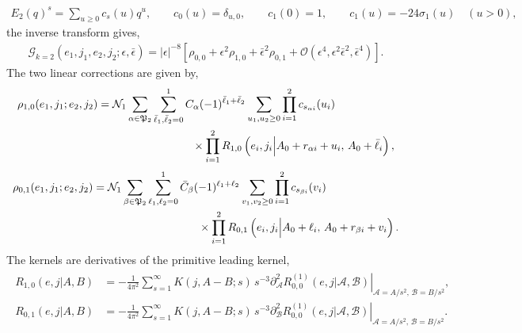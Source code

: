 \documentclass[12 pt]{article}
\begin{document}
\begin{align}
	    E_2(q)^s=\sum_{u\ge 0} c_s(u)q^u,
	    \qquad
    c_0(u)=\delta_{u,0},
    \qquad
    c_1(0)=1,\qquad
    c_1(u)=-24\sigma_1(u)\quad(u>0),
	\end{align}
	the inverse transform gives,
\begin{align}
    \mathcal{G}_{k=2}(e_1,j_1,e_2,j_2;\epsilon,\bar\epsilon)
    =|\epsilon|^{-8}\left[
    \rho_{0,0}
    +\epsilon^2\rho_{1,0}
    +\bar\epsilon^2\rho_{0,1}
    +\mathcal{O}(\epsilon^4,\epsilon^2\bar\epsilon^2,\bar\epsilon^4)
    \right].
\end{align}
\noindent
The two linear corrections are given by,
\begin{align}
\begin{split}
    \rho_{1,0}(e_1,j_1;e_2,j_2)
    &=
    \mathcal N_1
    \sum_{\alpha\in\mathfrak P_2}
    \sum_{\bar\ell_1,\bar\ell_2=0}^{1}
    C_\alpha(-1)^{\bar\ell_1+\bar\ell_2}
    \sum_{u_1,u_2\ge0}
    \prod_{i=1}^2 c_{s_{\alpha i}}(u_i)\\&\hspace{3 cm}\times
    \prod_{i=1}^2
    R_{1,0}
    \left(
    e_i,j_i\Big|
    A_0+r_{\alpha i}+u_i,\,
    A_0+\bar\ell_i
    \right),
\end{split}
\end{align}
\begin{align}
\begin{split}
    \rho_{0,1}(e_1,j_1;e_2,j_2)
    &=
    \mathcal N_1
    \sum_{\beta\in\mathfrak P_2}
    \sum_{\ell_1,\ell_2=0}^{1}
    \bar C_\beta(-1)^{\ell_1+\ell_2}
    \sum_{v_1,v_2\ge0}
    \prod_{i=1}^2 c_{s_{\beta i}}(v_i)\\
    &\quad\hspace{3 cm}\times
    \prod_{i=1}^2
    R_{0,1}
    \left(
    e_i,j_i\Big|
    A_0+\ell_i,\,
    A_0+r_{\beta i}+v_i
    \right).
\end{split}
\label{5.30jj}
\end{align}
The kernels are derivatives of the primitive leading kernel,
\begin{align}
\begin{split}
    R_{1,0}(e,j|A,B)
    &=
    -\frac{1}{4\pi^2}
    \sum_{s=1}^{\infty}
    K(j,A-B;s)\,s^{-3}
    \left.
    \partial_{\mathcal A}^2
    R_{0,0}^{(1)}(e,j|\mathcal A,\mathcal B)
    \right|_{\mathcal A=A/s^2,\,\mathcal B=B/s^2},
\\
    R_{0,1}(e,j|A,B)
    &=
    -\frac{1}{4\pi^2}
    \sum_{s=1}^{\infty}
    K(j,A-B;s)\,s^{-3}
    \left.
    \partial_{\mathcal B}^2
    R_{0,0}^{(1)}(e,j|\mathcal A,\mathcal B)
    \right|_{\mathcal A=A/s^2,\,\mathcal B=B/s^2}.
\end{split}
\label{eq:g2-R10-R01-perturbative}
\end{align}
\end{document}
